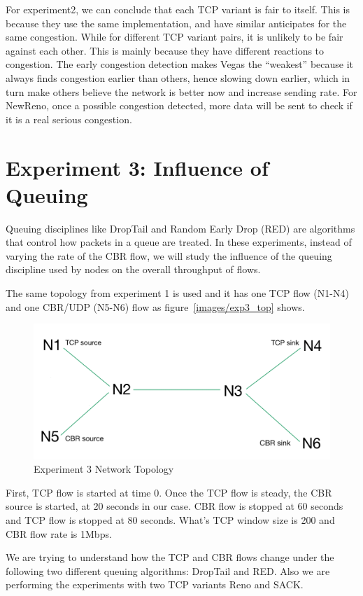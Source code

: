 \documentclass[10pt, conference]{lib/IEEEtran}
\begin{document}
For experiment2, we can conclude that each TCP variant is fair to itself. This is because they use the same implementation, and have 
similar anticipates for the same congestion. While for different TCP 
variant pairs, it is unlikely to be fair against each other. This is mainly because they have different reactions to congestion. The early
congestion detection makes Vegas the ``weakest'' because it always 
finds congestion earlier than others, hence slowing down earlier, 
which in turn make others believe the network is better now and 
increase sending rate. For NewReno, once a possible congestion 
detected, more data will be sent to check if it is a real serious 
congestion. 

\section{Experiment 3: Influence of Queuing}
Queuing disciplines like DropTail and Random Early Drop (RED) are algorithms that control how packets in a queue are treated. In these experiments, instead of varying the rate of the CBR flow, we will study the influence of the queuing discipline used by nodes on the overall throughput of flows.

The same topology from experiment 1 is used and it has one TCP flow (N1-N4) and one CBR/UDP (N5-N6) flow as figure~\ref{images/exp3_top} shows. 
\begin{figure}[!htb]
    \centering
    \includegraphics[width=0.8\linewidth]{images/top_exp3.png}
    \caption{Experiment 3 Network Topology}
    \label{fig:exp3_top}
\end{figure}
First, TCP flow is started at time 0. Once the TCP flow is steady, the CBR source is started, at 20 seconds in our case. CBR flow is stopped at 60 seconds and TCP flow is stopped at 80 seconds. What's TCP window size is 200 and CBR flow rate is 1Mbps.

We are trying to understand how the TCP and CBR flows change under the following two different queuing algorithms: DropTail and RED. Also we are performing the experiments with two TCP variants Reno and SACK.\\
\end{document}

